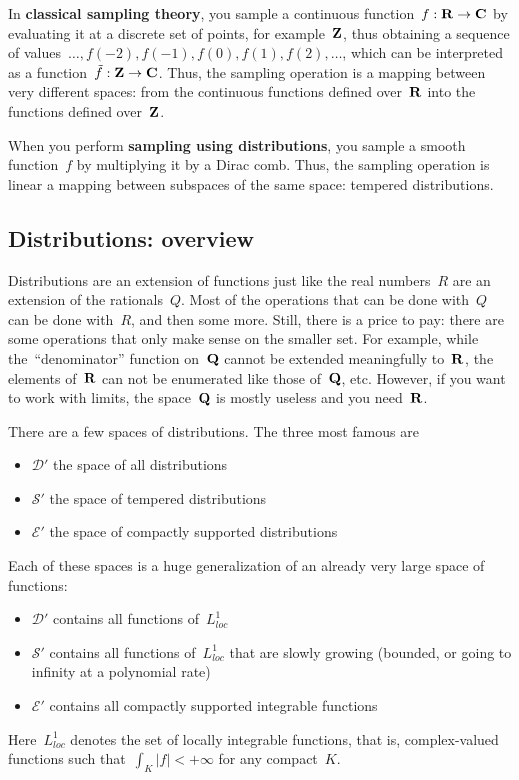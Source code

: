 In {\bf classical sampling theory}, you sample a continuous
function~$f:\mathbf{R}\to\mathbf{C}$ by evaluating it at a discrete set of points,
for example~$\mathbf{Z}$, thus obtaining a sequence of
values~$\ldots,f(-2),f(-1),f(0),f(1),f(2),\ldots$, which can be
interpreted as a function~$\tilde f:\mathbf{Z}\to\mathbf{C}$.  Thus, the sampling
operation is a mapping between very different spaces: from the
continuous functions defined over~$\mathbf{R}$ into the functions defined
over~$\mathbf{Z}$.

When you perform {\bf sampling using distributions}, you sample a
smooth function~$f$ by multiplying it by a Dirac comb.  Thus,
the sampling operation is linear a mapping between subspaces of the same
space: tempered distributions.

\subsection{Distributions: overview}

Distributions are an extension of functions just like the real
numbers~$R$ are an extension of the rationals~$Q$.  Most of the
operations that can be done with~$Q$ can be done with~$R$, and then
some more.  Still, there is a price to pay: there are some
operations that only make sense on the smaller set.  For example,
while the~``denominator'' function on~$\mathbf{Q}$ cannot be extended
meaningfully to~$\mathbf{R}$, the elements of~$\mathbf{R}$ can not be enumerated like
those of~$\mathbf{Q}$, etc.  However, if you want to work with limits, the
space~$\mathbf{Q}$ is mostly useless and you need~$\mathbf{R}$.

There are a few spaces of distributions.  The three most famous are
\begin{itemize}
	\item $\mathcal{D}'$ the space of all distributions
	\item $\mathcal{S}'$ the space of tempered distributions
	\item $\mathcal{E}'$ the space of compactly supported distributions
\end{itemize}

Each of these spaces is a huge generalization of an already very large
space of functions:
\begin{itemize}
	\item $\mathcal{D}'$ contains all functions of~$L^1_{loc}$
	\item $\mathcal{S}'$ contains all functions of~$L^1_{loc}$ that
		are slowly growing (bounded, or going to infinity at a polynomial
		rate)
	\item $\mathcal{E}'$ contains all compactly supported integrable
		functions
\end{itemize}
Here~$L^1_{loc}$ denotes the set of locally integrable functions,
that is, complex-valued functions such that~$\int_K|f| <+\infty$ for
any compact~$K$.

